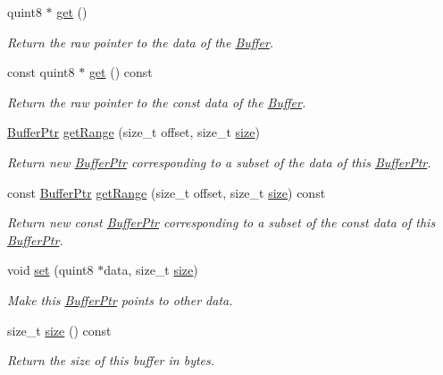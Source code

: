 \begin{DoxyCompactItemize}
quint8 $\ast$ \hyperlink{class_gost_crypt_1_1_buffer_ptr_af90ea689dd0dd362c7b0ea90b90c17ea}{get} ()
\begin{DoxyCompactList}\small\item\em Return the raw pointer to the data of the \hyperlink{class_gost_crypt_1_1_buffer}{Buffer}. \end{DoxyCompactList}\item 
const quint8 $\ast$ \hyperlink{class_gost_crypt_1_1_buffer_ptr_a4cf47ef7551c41ce858a9f7df721e4ed}{get} () const
\begin{DoxyCompactList}\small\item\em Return the raw pointer to the const data of the \hyperlink{class_gost_crypt_1_1_buffer}{Buffer}. \end{DoxyCompactList}\item 
\hyperlink{class_gost_crypt_1_1_buffer_ptr}{Buffer\+Ptr} \hyperlink{class_gost_crypt_1_1_buffer_ptr_a07410949bd2a46ed7cd1cfc9669b2113}{get\+Range} (size\+\_\+t offset, size\+\_\+t \hyperlink{class_gost_crypt_1_1_buffer_ptr_a1fd092a6706a9ad67a601280ea1377d5}{size})
\begin{DoxyCompactList}\small\item\em Return new \hyperlink{class_gost_crypt_1_1_buffer_ptr}{Buffer\+Ptr} corresponding to a subset of the data of this \hyperlink{class_gost_crypt_1_1_buffer_ptr}{Buffer\+Ptr}. \end{DoxyCompactList}\item 
const \hyperlink{class_gost_crypt_1_1_buffer_ptr}{Buffer\+Ptr} \hyperlink{class_gost_crypt_1_1_buffer_ptr_a73110b347e30b1b69b63a1cb96c9aca8}{get\+Range} (size\+\_\+t offset, size\+\_\+t \hyperlink{class_gost_crypt_1_1_buffer_ptr_a1fd092a6706a9ad67a601280ea1377d5}{size}) const
\begin{DoxyCompactList}\small\item\em Return new const \hyperlink{class_gost_crypt_1_1_buffer_ptr}{Buffer\+Ptr} corresponding to a subset of the const data of this \hyperlink{class_gost_crypt_1_1_buffer_ptr}{Buffer\+Ptr}. \end{DoxyCompactList}\item 
void \hyperlink{class_gost_crypt_1_1_buffer_ptr_adacd6631bd8d66305d0f636e29f9c92f}{set} (quint8 $\ast$data, size\+\_\+t \hyperlink{class_gost_crypt_1_1_buffer_ptr_a1fd092a6706a9ad67a601280ea1377d5}{size})
\begin{DoxyCompactList}\small\item\em Make this \hyperlink{class_gost_crypt_1_1_buffer_ptr}{Buffer\+Ptr} points to other data. \end{DoxyCompactList}\item 
size\+\_\+t \hyperlink{class_gost_crypt_1_1_buffer_ptr_a1fd092a6706a9ad67a601280ea1377d5}{size} () const
\begin{DoxyCompactList}\small\item\em Return the size of this buffer in bytes. \end{DoxyCompactList}\end{DoxyCompactItemize}
